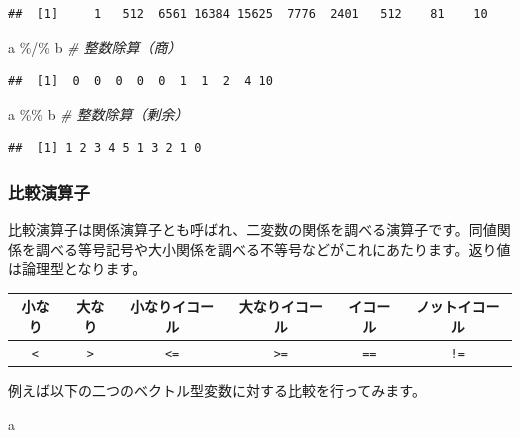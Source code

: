 \documentclass[
  12pt,
]{book}
\newenvironment{Shaded}{\begin{snugshade}}{\end{snugshade}}
\newcommand{\CommentTok}[1]{\textcolor[rgb]{0.56,0.35,0.01}{\textit{#1}}}
\newcommand{\NormalTok}[1]{#1}
\newcommand{\SpecialCharTok}[1]{\textcolor[rgb]{0.00,0.00,0.00}{#1}}
\begin{document}
\begin{verbatim}
##  [1]     1   512  6561 16384 15625  7776  2401   512    81    10
\end{verbatim}

\begin{Shaded}
\begin{Highlighting}[]
\NormalTok{a }\SpecialCharTok{\%/\%}\NormalTok{ b       }\CommentTok{\# 整数除算（商）}
\end{Highlighting}
\end{Shaded}

\begin{verbatim}
##  [1]  0  0  0  0  0  1  1  2  4 10
\end{verbatim}

\begin{Shaded}
\begin{Highlighting}[]
\NormalTok{a }\SpecialCharTok{\%\%}\NormalTok{ b        }\CommentTok{\# 整数除算（剰余）}
\end{Highlighting}
\end{Shaded}

\begin{verbatim}
##  [1] 1 2 3 4 5 1 3 2 1 0
\end{verbatim}

\hypertarget{ux6bd4ux8f03ux6f14ux7b97ux5b50}{%
\subsubsection{比較演算子}\label{ux6bd4ux8f03ux6f14ux7b97ux5b50}}

比較演算子は関係演算子とも呼ばれ、二変数の関係を調べる演算子です。同値関係を調べる等号記号や大小関係を調べる不等号などがこれにあたります。返り値は論理型となります。

\begin{longtable}[]{@{}cccccc@{}}
\toprule
小なり & 大なり & 小なりイコール & 大なりイコール & イコール & ノットイコール \\
\midrule
\endhead
\texttt{\textless{}} & \texttt{\textgreater{}} & \texttt{\textless{}=} & \texttt{\textgreater{}=} & \texttt{==} & \texttt{!=} \\
\bottomrule
\end{longtable}

例えば以下の二つのベクトル型変数に対する比較を行ってみます。

\begin{Shaded}
\begin{Highlighting}[]
\NormalTok{a}
\end{Highlighting}
\end{Shaded}
\end{document}
